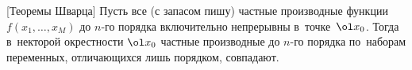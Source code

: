 [Теоремы Шварца]
	 Пусть все (с запасом пишу) частные производные функции $f(x_1,\ldots,x_M)$ до $n$-го порядка включительно непрерывны в~точке~$\ol x_0$.
	 Тогда в~некторой окрестности $\ol x_0$ частные производные до $n$-го порядка по~наборам переменных, отличающихся лишь порядком, совпадают. 
	 